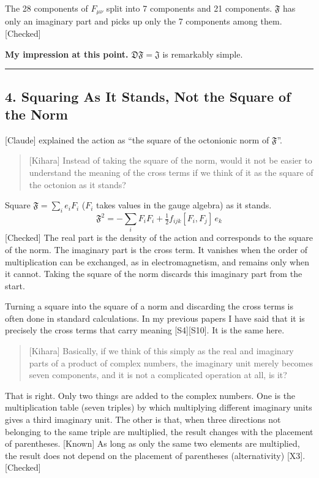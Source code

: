 \documentclass[
  a4paper,
]{article}
\begin{document}
The 28 components of \(F_{\mu\nu}\) split into 7 components and 21
components. \(\mathfrak{F}\) has only an imaginary part and picks up
only the 7 components among them. {[}Checked{]}

\textbf{My impression at this point.}
\(\mathfrak{D}\mathfrak{F} = \mathfrak{J}\) is remarkably simple.

\begin{center}\rule{0.5\linewidth}{0.5pt}\end{center}

\subsection{4. Squaring As It Stands, Not the Square of the
Norm}\label{squaring-as-it-stands-not-the-square-of-the-norm}

{[}Claude{]} explained the action as ``the square of the octonionic norm
of \(\mathfrak{F}\)''.

\begin{quote}
{[}Kihara{]} Instead of taking the square of the norm, would it not be
easier to understand the meaning of the cross terms if we think of it as
the square of the octonion as it stands?
\end{quote}

Square \(\mathfrak{F} = \sum_i e_i F_i\) (\(F_i\) takes values in the
gauge algebra) as it stands. \[
\mathfrak{F}^2 = -\sum_i F_iF_i + \tfrac12 f_{ijk}[F_i, F_j]\,e_k \tag{4.1}
\] {[}Checked{]} The real part is the density of the action and
corresponds to the square of the norm. The imaginary part is the cross
term. It vanishes when the order of multiplication can be exchanged, as
in electromagnetism, and remains only when it cannot. Taking the square
of the norm discards this imaginary part from the start.

Turning a square into the square of a norm and discarding the cross
terms is often done in standard calculations. In my previous papers I
have said that it is precisely the cross terms that carry meaning
{[}S4{]}{[}S10{]}. It is the same here.

\begin{quote}
{[}Kihara{]} Basically, if we think of this simply as the real and
imaginary parts of a product of complex numbers, the imaginary unit
merely becomes seven components, and it is not a complicated operation
at all, is it?
\end{quote}

That is right. Only two things are added to the complex numbers. One is
the multiplication table (seven triples) by which multiplying different
imaginary units gives a third imaginary unit. The other is that, when
three directions not belonging to the same triple are multiplied, the
result changes with the placement of parentheses. {[}Known{]} As long as
only the same two elements are multiplied, the result does not depend on
the placement of parentheses (alternativity) {[}X3{]}. {[}Checked{]}
\end{document}
